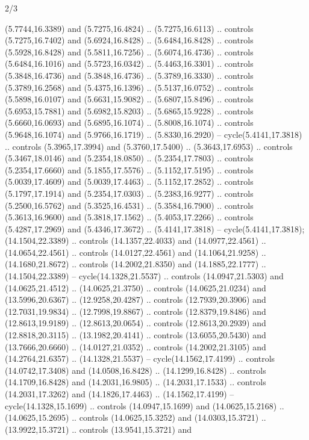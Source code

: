 \begin{flagdescription}{2/3}
\begin{scope}[yshift=\flagwidth,scale=\flagwidth/1241.93737]
\begin{scope}[y=-1mm, x=1mm,draw=gold,fill=blue,line join=miter,miter limit=4,line width=1.8\lw]
{  (5.7744,16.3389) and (5.7275,16.4824) .. (5.7275,16.6113) .. controls
  (5.7275,16.7402) and (5.6924,16.8428) .. (5.6484,16.8428) .. controls
  (5.5928,16.8428) and (5.5811,16.7256) .. (5.6074,16.4736) .. controls
  (5.6484,16.1016) and (5.5723,16.0342) .. (5.4463,16.3301) .. controls
  (5.3848,16.4736) and (5.3848,16.4736) .. (5.3789,16.3330) .. controls
  (5.3789,16.2568) and (5.4375,16.1396) .. (5.5137,16.0752) .. controls
  (5.5898,16.0107) and (5.6631,15.9082) .. (5.6807,15.8496) .. controls
  (5.6953,15.7881) and (5.6982,15.8203) .. (5.6865,15.9228) .. controls
  (5.6660,16.0693) and (5.6895,16.1074) .. (5.8008,16.1074) .. controls
  (5.9648,16.1074) and (5.9766,16.1719) .. (5.8330,16.2920) --
  cycle(5.4141,17.3818) .. controls (5.3965,17.3994) and (5.3760,17.5400) ..
  (5.3643,17.6953) .. controls (5.3467,18.0146) and (5.2354,18.0850) ..
  (5.2354,17.7803) .. controls (5.2354,17.6660) and (5.1855,17.5576) ..
  (5.1152,17.5195) .. controls (5.0039,17.4609) and (5.0039,17.4463) ..
  (5.1152,17.2852) .. controls (5.1797,17.1914) and (5.2354,17.0303) ..
  (5.2383,16.9277) .. controls (5.2500,16.5762) and (5.3525,16.4531) ..
  (5.3584,16.7900) .. controls (5.3613,16.9600) and (5.3818,17.1562) ..
  (5.4053,17.2266) .. controls (5.4287,17.2969) and (5.4346,17.3672) ..
  (5.4141,17.3818) -- cycle(5.4141,17.3818);
 (14.1504,22.3389) .. controls (14.1357,22.4033)
  and (14.0977,22.4561) .. (14.0654,22.4561) .. controls (14.0127,22.4561) and
  (14.1064,21.9258) .. (14.1680,21.8672) .. controls (14.2002,21.8350) and
  (14.1885,22.1777) .. (14.1504,22.3389) -- cycle(14.1328,21.5537) .. controls
  (14.0947,21.5303) and (14.0625,21.4512) .. (14.0625,21.3750) .. controls
  (14.0625,21.0234) and (13.5996,20.6367) .. (12.9258,20.4287) .. controls
  (12.7939,20.3906) and (12.7031,19.9834) .. (12.7998,19.8867) .. controls
  (12.8379,19.8486) and (12.8613,19.9189) .. (12.8613,20.0654) .. controls
  (12.8613,20.2939) and (12.8818,20.3115) .. (13.1982,20.4141) .. controls
  (13.6055,20.5430) and (13.7666,20.6660) .. (14.0127,21.0352) .. controls
  (14.2002,21.3105) and (14.2764,21.6357) .. (14.1328,21.5537) --
  cycle(14.1562,17.4199) .. controls (14.0742,17.3408) and (14.0508,16.8428) ..
  (14.1299,16.8428) .. controls (14.1709,16.8428) and (14.2031,16.9805) ..
  (14.2031,17.1533) .. controls (14.2031,17.3262) and (14.1826,17.4463) ..
  (14.1562,17.4199) -- cycle(14.1328,15.1699) .. controls (14.0947,15.1699) and
  (14.0625,15.2168) .. (14.0625,15.2695) .. controls (14.0625,15.3252) and
  (14.0303,15.3721) .. (13.9922,15.3721) .. controls (13.9541,15.3721) and
}
\end{scope}
\end{scope}
\end{flagdescription}
